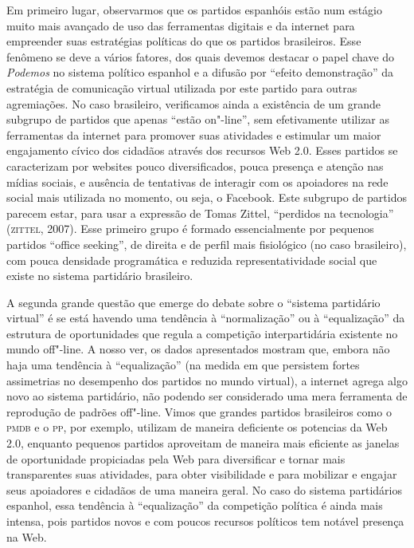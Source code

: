 Em primeiro lugar, observarmos que os partidos espanhóis estão num
estágio muito mais avançado de uso das ferramentas digitais e da
internet para empreender suas estratégias políticas do que os partidos
brasileiros. Esse fenômeno se deve a vários fatores, dos quais devemos
destacar o papel chave do \emph{Podemos} no sistema político espanhol e
a difusão por ``efeito demonstração'' da estratégia de comunicação
virtual utilizada por este partido para outras agremiações. No caso
brasileiro, verificamos ainda a existência de um grande subgrupo de
partidos que apenas ``estão on"-line'', sem efetivamente utilizar as
ferramentas da internet para promover suas atividades e estimular um
maior engajamento cívico dos cidadãos através dos recursos Web 2.0.
Esses partidos se caracterizam por websites pouco diversificados, pouca
presença e atenção nas mídias sociais, e ausência de tentativas de
interagir com os apoiadores na rede social mais utilizada no momento, ou
seja, o Facebook. Este subgrupo de partidos parecem estar, para usar a
expressão de Tomas Zittel, ``perdidos na tecnologia'' (\textsc{zittel}, 2007).
Esse primeiro grupo é formado essencialmente por pequenos partidos
``office seeking'', de direita e de perfil mais fisiológico (no caso
brasileiro), com pouca densidade programática e reduzida
representatividade social que existe no sistema partidário brasileiro.

A segunda grande questão que emerge do debate sobre o ``sistema
partidário virtual'' é se está havendo uma tendência à ``normalização''
ou à ``equalização'' da estrutura de oportunidades que regula a
competição interpartidária existente no mundo off"-line. A nosso ver, os
dados apresentados mostram que, embora não haja uma tendência à
``equalização'' (na medida em que persistem fortes assimetrias no
desempenho dos partidos no mundo virtual), a internet agrega algo novo
ao sistema partidário, não podendo ser considerado uma mera ferramenta
de reprodução de padrões off"-line. Vimos que grandes partidos
brasileiros como o \textsc{pmdb} e o \textsc{pp}, por exemplo, utilizam de maneira
deficiente os potencias da Web 2.0, enquanto pequenos partidos
aproveitam de maneira mais eficiente as janelas de oportunidade
propiciadas pela Web para diversificar e tornar mais transparentes suas
atividades, para obter visibilidade e para mobilizar e engajar seus
apoiadores e cidadãos de uma maneira geral. No caso do sistema
partidários espanhol, essa tendência à ``equalização'' da competição
política é ainda mais intensa, pois partidos novos e com poucos recursos
políticos tem notável presença na Web.

